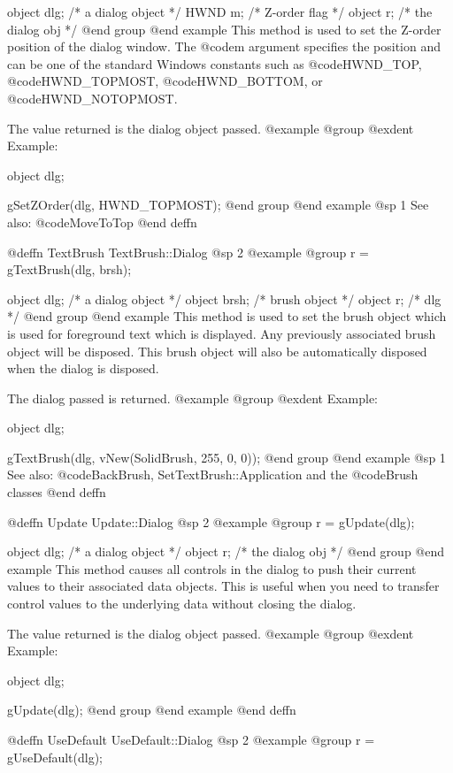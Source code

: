 object  dlg;   /*  a dialog object  */
HWND    m;     /*  Z-order flag     */
object  r;     /*  the dialog obj   */
@end group
@end example
This method is used to set the Z-order position of the dialog window.
The @code{m} argument specifies the position and can be one of the
standard Windows constants such as @code{HWND_TOP}, @code{HWND_TOPMOST},
@code{HWND_BOTTOM}, or @code{HWND_NOTOPMOST}.

The value returned is the dialog object passed.
@example
@group
@exdent Example:

object  dlg;

gSetZOrder(dlg, HWND_TOPMOST);
@end group
@end example
@sp 1
See also:  @code{MoveToTop}
@end deffn




@deffn {TextBrush} TextBrush::Dialog
@sp 2
@example
@group
r = gTextBrush(dlg, brsh);

object  dlg;    /*  a dialog object   */
object  brsh;   /*  brush object      */
object  r;      /*  dlg               */
@end group
@end example
This method is used to set the brush object which is used for foreground
text which is displayed.  Any previously associated brush object will
be disposed.  This brush object will also be automatically disposed when the
dialog is disposed.

The dialog passed is returned.
@example
@group
@exdent Example:

object  dlg;

gTextBrush(dlg, vNew(SolidBrush, 255, 0, 0));
@end group
@end example
@sp 1
See also:  @code{BackBrush, SetTextBrush::Application}
        and the @code{Brush} classes
@end deffn


@deffn {Update} Update::Dialog
@sp 2
@example
@group
r = gUpdate(dlg);

object  dlg;   /*  a dialog object  */
object  r;     /*  the dialog obj   */
@end group
@end example
This method causes all controls in the dialog to push their current
values to their associated data objects.  This is useful when you need
to transfer control values to the underlying data without closing the
dialog.

The value returned is the dialog object passed.
@example
@group
@exdent Example:

object  dlg;

gUpdate(dlg);
@end group
@end example
@end deffn




@deffn {UseDefault} UseDefault::Dialog
@sp 2
@example
@group
r = gUseDefault(dlg);

